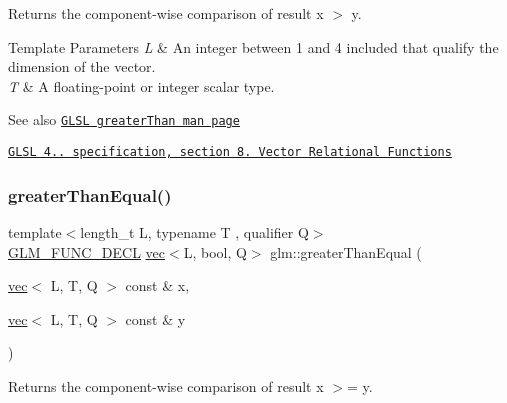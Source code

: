 Returns the component-\/wise comparison of result x $>$ y.


\begin{DoxyTemplParams}{Template Parameters}
{\em L} & An integer between 1 and 4 included that qualify the dimension of the vector. \\
\hline
{\em T} & A floating-\/point or integer scalar type.\\
\hline
\end{DoxyTemplParams}
\begin{DoxySeeAlso}{See also}
\href{http://www.opengl.org/sdk/docs/manglsl/xhtml/greaterThan.xml}{\tt G\+L\+SL greater\+Than man page} 

\href{http://www.opengl.org/registry/doc/GLSLangSpec.4.20.8.pdf}{\tt G\+L\+SL 4.. specification, section 8. Vector Relational Functions} 
\end{DoxySeeAlso}
\mbox{\label{group__core__func__vector__relational_ga271038c5290184127754bda0ae91a5bd}} 
\subsubsection{\texorpdfstring{greater\+Than\+Equal()}{greaterThanEqual()}}
{\footnotesize\ttfamily template$<$length\+\_\+t L, typename T , qualifier Q$>$ \\
\hyperlink{setup_8hpp_ab2d052de21a70539923e9bcbf6e83a51}{G\+L\+M\+\_\+\+F\+U\+N\+C\+\_\+\+D\+E\+CL} \hyperlink{structglm_1_1vec}{vec}$<$L, bool, Q$>$ glm\+::greater\+Than\+Equal (\begin{DoxyParamCaption}\item[{\hyperlink{structglm_1_1vec}{vec}$<$ L, T, Q $>$ const \&}]{x,  }\item[{\hyperlink{structglm_1_1vec}{vec}$<$ L, T, Q $>$ const \&}]{y }\end{DoxyParamCaption})}

Returns the component-\/wise comparison of result x $>$= y.


